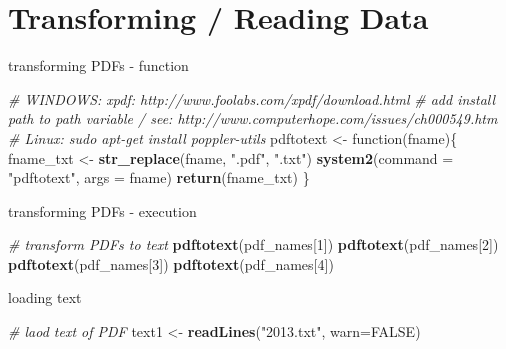 \documentclass[ignorenonframetext,]{beamer}
\newenvironment{Shaded}{\begin{snugshade}}{\end{snugshade}}
\newcommand{\KeywordTok}[1]{\textcolor[rgb]{0.13,0.29,0.53}{\textbf{{#1}}}}
\newcommand{\DataTypeTok}[1]{\textcolor[rgb]{0.13,0.29,0.53}{{#1}}}
\newcommand{\DecValTok}[1]{\textcolor[rgb]{0.00,0.00,0.81}{{#1}}}
\newcommand{\StringTok}[1]{\textcolor[rgb]{0.31,0.60,0.02}{{#1}}}
\newcommand{\CommentTok}[1]{\textcolor[rgb]{0.56,0.35,0.01}{\textit{{#1}}}}
\newcommand{\OtherTok}[1]{\textcolor[rgb]{0.56,0.35,0.01}{{#1}}}
\newcommand{\NormalTok}[1]{{#1}}
\begin{document}
\section{Transforming / Reading Data}\label{transforming-reading-data}

\begin{frame}[fragile]{transforming PDFs - function}

\begin{Shaded}
\begin{Highlighting}[]
\CommentTok{# WINDOWS: xpdf: http://www.foolabs.com/xpdf/download.html }
\CommentTok{#   add install path to path variable / see: http://www.computerhope.com/issues/ch000549.htm}
\CommentTok{# Linux: sudo apt-get install poppler-utils}
\NormalTok{pdftotext <-}\StringTok{ }\NormalTok{function(fname)\{}
  \NormalTok{fname_txt <-}\StringTok{ }\KeywordTok{str_replace}\NormalTok{(fname, }\StringTok{".pdf"}\NormalTok{, }\StringTok{".txt"}\NormalTok{)}
  \KeywordTok{system2}\NormalTok{(}\DataTypeTok{command =} \StringTok{"pdftotext"}\NormalTok{, }\DataTypeTok{args =} \NormalTok{fname)}
  \KeywordTok{return}\NormalTok{(fname_txt)}
\NormalTok{\}}
\end{Highlighting}
\end{Shaded}

\end{frame}

\begin{frame}[fragile]{transforming PDFs - execution}

\begin{Shaded}
\begin{Highlighting}[]
\CommentTok{# transform PDFs to text}
\KeywordTok{pdftotext}\NormalTok{(pdf_names[}\DecValTok{1}\NormalTok{])}
\KeywordTok{pdftotext}\NormalTok{(pdf_names[}\DecValTok{2}\NormalTok{])}
\KeywordTok{pdftotext}\NormalTok{(pdf_names[}\DecValTok{3}\NormalTok{])}
\KeywordTok{pdftotext}\NormalTok{(pdf_names[}\DecValTok{4}\NormalTok{])}
\end{Highlighting}
\end{Shaded}

\end{frame}

\begin{frame}[fragile]{loading text}

\begin{Shaded}
\begin{Highlighting}[]
\CommentTok{# laod text of PDF}
\NormalTok{text1 <-}\StringTok{ }\KeywordTok{readLines}\NormalTok{(}\StringTok{"2013.txt"}\NormalTok{, }\DataTypeTok{warn=}\OtherTok{FALSE}\NormalTok{)}
\end{Highlighting}
\end{Shaded}

\end{frame}
\end{document}

